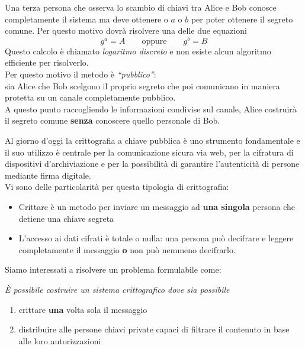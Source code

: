 Una terza persona che osserva lo scambio di chiavi tra Alice e Bob conosce completamente il sistema ma deve ottenere o $a$ o $b$ per poter ottenere il segreto comune. Per questo motivo dovrà risolvere una delle due equazioni
\[ g^a = A \qquad \text{oppure} \qquad g^b = B \]
Questo calcolo è chiamato \emph{logaritmo discreto} e non esiste alcun algoritmo efficiente per risolverlo.\\
Per questo motivo il metodo è \emph{``pubblico''}:\\
sia Alice che Bob scelgono il proprio segreto che poi comunicano in maniera protetta su un canale completamente pubblico.\\
A questo punto raccogliendo le informazioni condivise sul canale, Alice costruirà il segreto comune \textbf{senza} conoscere quello personale di Bob.
\vspace{0.4cm}

Al giorno d'oggi la crittografia a chiave pubblica è uno strumento fondamentale e il suo utilizzo è centrale per la comunicazione sicura via web, per la cifratura di dispositivi d'archiviazione e per la possibilità di garantire l'autenticità di persone mediante firma digitale.\\[0.2cm]


Vi sono delle particolarità per questa tipologia di crittografia:
\begin{itemize}
	\item Crittare è un metodo per inviare un messaggio ad \textbf{una singola} persona che detiene una chiave segreta
	\item L'accesso ai dati cifrati è totale o nulla: una persona può decifrare e leggere completamente il messaggio \textbf{o} non può nemmeno decifrarlo.
\end{itemize}

\vspace{1cm}
Siamo interessati a risolvere un problema formulabile come:

\begin{center}
{\itshape È possibile costruire un sistema crittografico dove sia possibile 
\begin{enumerate}
	\item crittare \textbf{una} volta sola il messaggio \label{critto1}
	\item distribuire alle persone chiavi private capaci di filtrare il contenuto in base alle loro autorizzazioni \label{critto2}
\end{enumerate}
}
\end{center}
\vspace{0.6cm}

